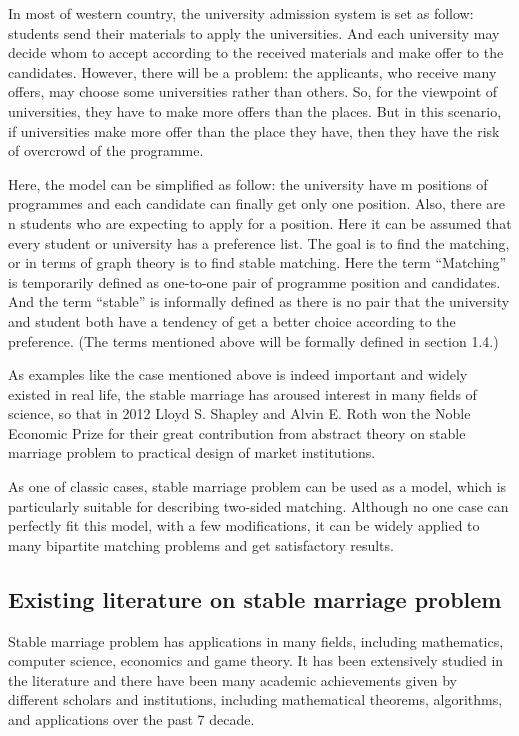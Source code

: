 \documentclass[14pt]{extarticle}
\begin{document}
In most of western country, the university admission system is set as follow: 
students send their materials to apply the universities. And each university may decide whom to accept according to the received materials and make offer to the candidates. 
However, there will be a problem: the applicants, who receive many offers, may choose some universities rather than others. 
So, for the viewpoint of universities, they have to make more offers than the places. 
But in this scenario, if universities make more offer than the place they have, then they have the risk of overcrowd of the programme.

Here, the model can be simplified as follow: the university have m positions of programmes and each candidate can finally get only one position. 
Also, there are n students who are expecting to apply for a position. 
Here it can be assumed that every student or university has a preference list. 
The goal is to find the matching, or in terms of graph theory is to find stable matching. 
Here the term “Matching” is temporarily defined as one-to-one pair of programme position and candidates. 
And the term “stable” is informally defined as there is no pair that the university and student both have a tendency of get a better choice according to the preference. 
(The terms mentioned above will be formally defined in section 1.4.) 

As examples like the case mentioned above is indeed important and widely existed in real life, the stable marriage has aroused interest in many fields of science, 
so that in 2012 Lloyd S. Shapley and Alvin E. Roth won the Noble Economic Prize for their great contribution from abstract theory on stable marriage problem to practical design of market institutions.

As one of classic cases, stable marriage problem can be used as a model, which is particularly suitable for describing two-sided matching. 
Although no one case can perfectly fit this model, with a few modifications, it can be widely applied to many bipartite matching problems and get satisfactory results. 

\subsection{Existing literature on stable marriage problem}
Stable marriage problem has applications in many fields, including mathematics, computer science, economics and game theory. 
It has been extensively studied in the literature and there have been many academic achievements given by different scholars and institutions, 
including mathematical theorems, algorithms, and applications over the past 7 decade.
\end{document}
